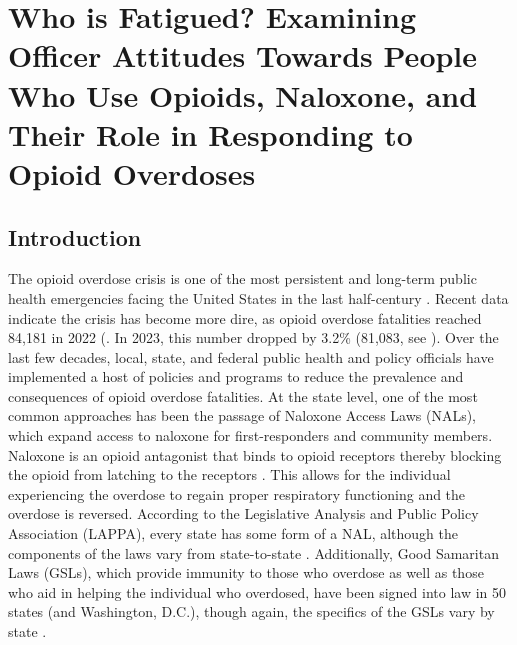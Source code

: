 \chapter{Who is Fatigued? Examining Officer Attitudes Towards People Who Use Opioids, Naloxone, and Their Role in Responding to Opioid Overdoses}

\section{\centering Introduction}

The opioid overdose crisis is one of the most persistent and long-term public health emergencies facing the United States in the last half-century \parencite{humphreys_responding_2022}. Recent data indicate the crisis has become more dire, as opioid overdose fatalities reached 84,181 in 2022 (\cite{center_for_disease_control_and_prevention_national_2023}. In 2023, this number dropped by 3.2\% (81,083, see \cite{center_for_disease_control_and_prevention_us_2024}). Over the last few decades, local, state, and federal public health and policy officials have implemented a host of policies and programs to reduce the prevalence and consequences of opioid overdose fatalities. At the state level, one of the most common approaches has been the passage of Naloxone Access Laws (NALs), which expand access to naloxone for first-responders and community members. Naloxone is an opioid antagonist that binds to opioid receptors thereby blocking the opioid from latching to the receptors \parencite{lurigio_opioid_2018}. This allows for the individual experiencing the overdose to regain proper respiratory functioning and the overdose is reversed. According to the Legislative Analysis and Public Policy Association (LAPPA), every state has some form of a NAL, although the components of the laws vary from state-to-state \parencite{legislative_analysis_and_public_policy_association_naloxone_2022}. Additionally, Good Samaritan Laws (GSLs), which provide immunity to those who overdose as well as those who aid in helping the individual who overdosed, have been signed into law in 50 states (and Washington, D.C.), though again, the specifics of the GSLs vary by state \parencite{west_good_2023}. 


